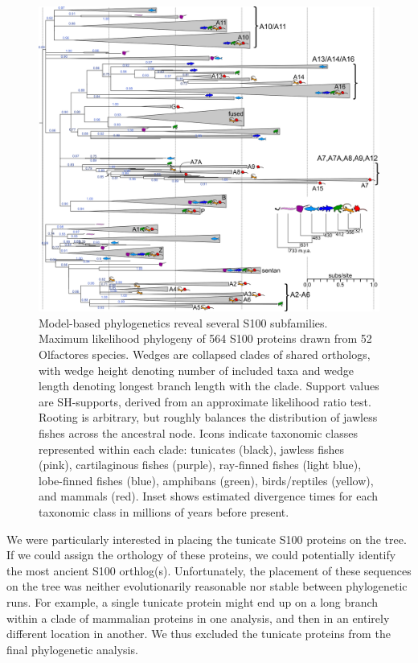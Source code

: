 \begin{figure}
\centering
	\includegraphics{ch3-fig2-smaller.png} 
\caption[Model-based phylogenetics reveal several S100 subfamilies]{Model-based phylogenetics reveal several S100 subfamilies.
Maximum likelihood phylogeny of 564 S100 proteins drawn from 52 Olfactores species. Wedges are collapsed clades of shared orthologs, with wedge height denoting number of included taxa and wedge length denoting longest branch length with the clade. Support values are SH-supports, derived from an approximate likelihood ratio test. Rooting is arbitrary, but roughly balances the distribution of jawless fishes across the ancestral node. Icons indicate taxonomic classes represented within each clade: tunicates (black), jawless fishes (pink), cartilaginous fishes (purple), ray-finned fishes (light blue), lobe-finned fishes (blue), amphibans (green), birds/reptiles (yellow), and mammals (red). Inset shows estimated divergence times for each taxonomic class in millions of years before present.\label{samplefigure}}	
\end{figure}


We were particularly interested in placing the tunicate S100 proteins
on the tree. If we could assign the orthology of these proteins, we
could potentially identify the most ancient S100 orthlog(s). Unfortunately,
the placement of these sequences on the tree was neither evolutionarily
reasonable nor stable between phylogenetic runs. For example, a single
tunicate protein might end up on a long branch within a clade of mammalian
proteins in one analysis, and then in an entirely different location
in another. We thus excluded the tunicate proteins from the final
phylogenetic analysis.

